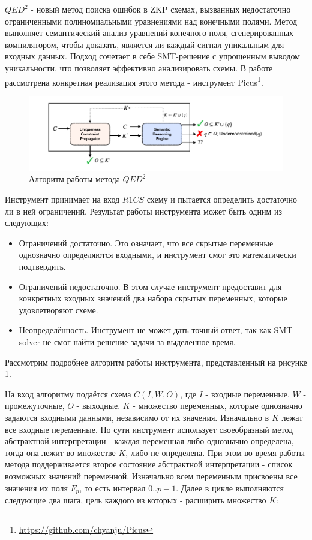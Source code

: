 \documentclass[a4paper]{article}
\begin{document}
$QED^2$\cite{litlink7} - новый метод поиска ошибок в ZKP схемах, вызванных недостаточно ограниченными полиномиальными уравнениями над конечными полями. Метод выполняет семантический анализ уравнений конечного поля, сгенерированных компилятором, чтобы доказать, является ли каждый сигнал уникальным для входных данных. Подход сочетает в себе SMT-решение с упрощенным выводом уникальности, что позволяет эффективно
анализировать схемы. В работе рассмотрена конкретная реализация этого метода - инструмент Picus\footnote[1]{\href{https://github.com/chyanju/Picus}{https://github.com/chyanju/Picus}}.

\begin{figure}[ht!]
\includegraphics[width=180mm]{QED_algo.png}
\caption{Алгоритм работы метода $QED^2$}
\label{QED_algo}
\end{figure}

Инструмент принимает на вход $R1CS$ схему и пытается определить достаточно ли в ней ограничений. Результат работы инструмента может быть одним из следующих:

\begin{itemize}
    \item Ограничений достаточно. Это означает, что все скрытые переменные однозначно определяются входными, и инструмент смог это математически подтвердить.
    \item Ограничений недостаточно. В этом случае инструмент предоставит для конкретных входных значений два набора скрытых переменных, которые удовлетворяют схеме.
    \item Неопределённость. Инструмент не может дать точный ответ, так как SMT-solver не смог найти решение задачи за выделенное время.
\end{itemize}

Рассмотрим подробнее алгоритм работы инструмента, представленный на рисунке \ref{QED_algo}.

На вход алгоритму подаётся схема $C(I,W,O)$, где $I$ - входные переменные, $W$ - промежуточные, $O$ - выходные. $K$ - множество переменных, которые однозначно задаются входными данными, независимо от их значения. Изначально в $K$ лежат все входные переменные. По сути инструмент использует своеобразный метод абстрактной интерпретации - каждая переменная либо однозначно определена, тогда она лежит во множестве $K$, либо не определена. При этом во время работы метода поддерживается второе состояние абстрактной интерпретации - список возможных значений переменной. Изначально всем переменным присвоены все значения их поля $F_p$, то есть интервал $0..p-1$. Далее в цикле выполняются следующие два шага, цель каждого из которых - расширить множество $K$:
\end{document}

